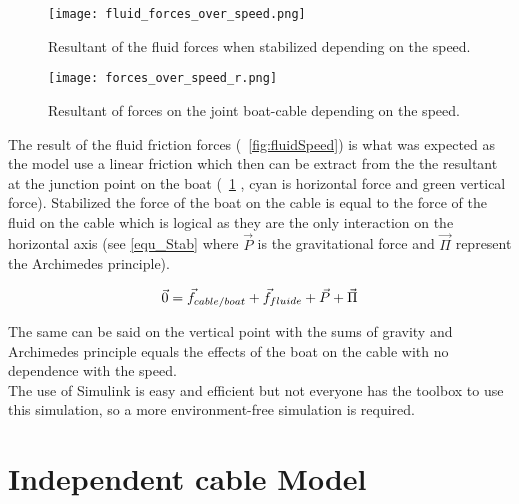 \begin{figure}[H]
\centering
    \begin{minipage}[b]{0.4\textwidth}
    \centering
    \texttt{[image: fluid\_forces\_over\_speed.png]}
    \caption{Resultant of the fluid forces when stabilized depending on the speed.}
    \label{fig:fluidSpeed}
    \end{minipage}
    \hfill
    \begin{minipage}[b]{0.45\textwidth}
    \centering
    \texttt{[image: forces\_over\_speed\_r.png]}
    \caption{Resultant of forces on the joint boat-cable depending on the speed.}
    \label{fig:forceSpeed}
    \end{minipage}
\end{figure}

The result of the fluid friction forces (~\ref{fig:fluidSpeed}) is what was expected as the model use a linear friction which then can be extract from the the resultant at the junction point on the boat (~\ref{fig:forceSpeed} , cyan is horizontal force and green vertical force). Stabilized the force of the boat on the cable is equal to the force of the fluid on the cable which is logical as they are the only interaction on the horizontal axis (see \eqref{equ_Stab} where $\vec{P}$ is the gravitational force and $\vec{\Pi}$ represent the Archimedes principle).

\begin{equation}
 \vec{0} = \vec{f}_{cable/boat}+\vec{f}_{fluide}+\vec{P}+\vec{\Pi}\\
 \label{equ_Stab}
\end{equation}

The same can be said on the vertical point with the sums of gravity and Archimedes principle equals the effects of the boat on the cable with no dependence with the speed.\\

The use of Simulink is easy and efficient but not everyone has the toolbox to use this simulation, so a more 
environment-free simulation is required.
\section{Independent cable Model}

